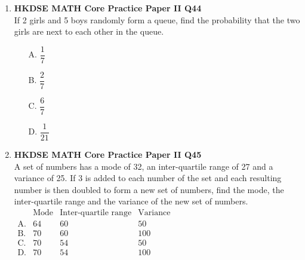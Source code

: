 \documentclass[12pt]{article}
\begin{document}
\begin{enumerate}
	\item \textbf{HKDSE MATH Core Practice Paper II Q44}\\
	If 2 girls and 5 boys randomly form a queue, find the probability that the two girls are next to each other in the queue.
	\begin{enumerate}
		\item[A.] $\dfrac{1}{7}$
		\item[B.] $\dfrac{2}{7}$
		\item[C.] $\dfrac{6}{7}$
		\item[D.] $\dfrac{1}{21}$
	\end{enumerate}
	
	\item \textbf{HKDSE MATH Core Practice Paper II Q45}\\
	A set of numbers has a mode of 32, an inter-quartile range of 27 and a variance of 25. If 3 is added to each number of the set and each resulting number is then doubled to form a new set of numbers, find the mode, the inter-quartile range and the variance of the new set of numbers.
	$\begin{matrix}
	&\text{Mode}&\text{Inter-quartile range}&\text{Variance}\\
	\text{A.}&64&60&50\\
	\text{B.}&70&60&100\\
	\text{C.}&70&54&50\\
	\text{D.}&70&54&100\\
	\end{matrix}$

\end{enumerate}
\end{document}
